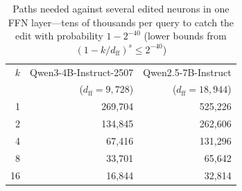 \begin{table}[t]
  \caption{Paths needed against several edited neurons in one FFN layer---tens of thousands per query to catch the edit with probability $1-2^{-40}$ (lower bounds from $(1-k/d_{\mathrm{ff}})^s\le2^{-40}$)}
  \label{tab:aligned}
  \footnotesize
  \centering
  \begin{tabular}{@{}rrr@{}}
    \toprule
    $k$ & Qwen3-4B-Instruct-2507 & Qwen2.5-7B-Instruct \\
        & ($d_{\mathrm{ff}}=9{,}728$) & ($d_{\mathrm{ff}}=18{,}944$) \\
    \midrule
    1  & 269{,}704 & 525{,}226 \\
    2  & 134{,}845 & 262{,}606 \\
    4  & 67{,}416  & 131{,}296 \\
    8  & 33{,}701  & 65{,}642  \\
    16 & 16{,}844  & 32{,}814  \\
    \bottomrule
  \end{tabular}
\end{table}
